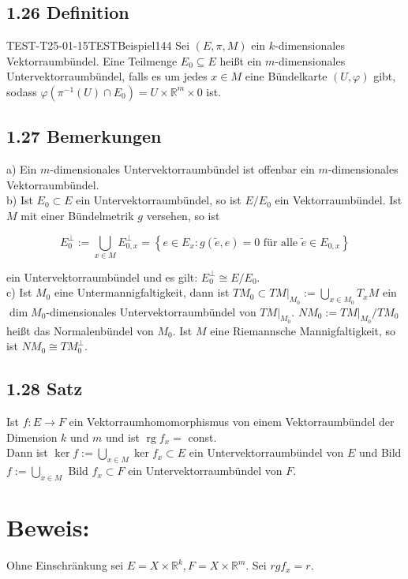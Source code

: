 \subsection*{1.26 Definition}
\begin{EXA}{TEST-T25-01-15}{TESTBeispiel144}
Sei $(E, \pi, M)$ ein $k$-dimensionales Vektorraumbündel. Eine Teilmenge $E_{0} \subseteq E$ heißt ein $m$-dimensionales Untervektorraumbündel, falls es um jedes $x \in M$ eine Bündelkarte $(U, \varphi)$ gibt, sodass $\varphi\left(\pi^{-1}(U) \cap E_{0}\right)=U \times \mathbb{R}^{m} \times 0$ ist.
\end{EXA}

\subsection*{1.27 Bemerkungen}
a) Ein $m$-dimensionales Untervektorraumbündel ist offenbar ein $m$-dimensionales Vektorraumbündel.\\
b) Ist $E_{0} \subset E$ ein Untervektorraumbündel, so ist $E / E_{0}$ ein Vektorraumbündel. Ist $M$ mit einer Bündelmetrik $g$ versehen, so ist

$$
E_{0}^{\perp}:=\bigcup_{x \in M} E_{0, x}^{\perp}=\left\{e \in E_{x}: g(\tilde{e}, e)=0 \text { für alle } \tilde{e} \in E_{0, x}\right\}
$$

ein Untervektorraumbündel und es gilt: $E_{0}^{\perp} \cong E / E_{0}$.\\
c) Ist $M_{0}$ eine Untermannigfaltigkeit, dann ist $\left.T M_{0} \subset T M\right|_{M_{0}}:=\bigcup_{x \in M_{0}} T_{x} M$ ein $\operatorname{dim} M_{0}$-dimensionales Untervektorraumbündel von $\left.T M\right|_{M_{0}}$. $N M_{0}:=\left.T M\right|_{M_{0}} / T M_{0}$ heißt das Normalenbündel von $M_{0}$. Ist $M$ eine Riemannsche Mannigfaltigkeit, so ist $N M_{0} \cong T M_{0}^{\perp}$.

\subsection*{1.28 Satz}
Ist $f: E \rightarrow F$ ein Vektorraumhomomorphismus von einem Vektorraumbündel der Dimension $k$ und $m$ und ist $\operatorname{rg} f_{x}=$ const.\\
Dann ist $\operatorname{ker} f:=\bigcup_{x \in M} \operatorname{ker} f_{x} \subset E$ ein Untervektorraumbündel von $E$ und Bild $f:=\bigcup_{x \in M}$ Bild $f_{x} \subset F$ ein Untervektorraumbündel von $F$.

\section*{Beweis:}
Ohne Einschränkung sei $E=X \times \mathbb{R}^{k}, F=X \times \mathbb{R}^{m}$. Sei $r g f_{x}=r$.

